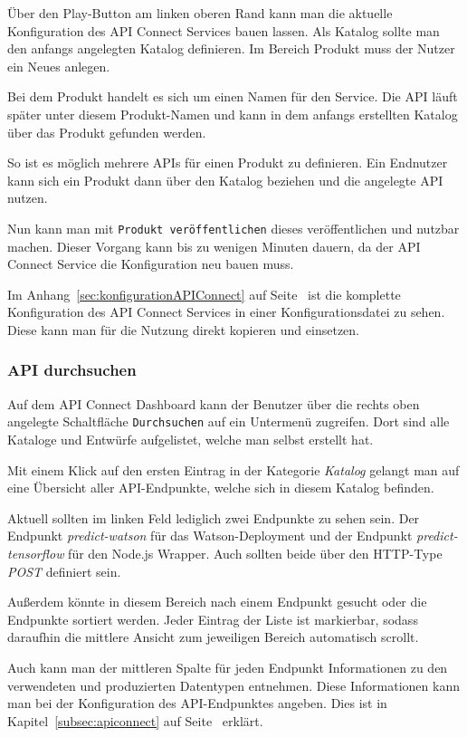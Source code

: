 Über den Play-Button am linken oberen Rand kann man die aktuelle Konfiguration des API Connect Services bauen lassen.
Als Katalog sollte man den anfangs angelegten Katalog definieren. Im Bereich Produkt muss der Nutzer ein Neues anlegen.

Bei dem Produkt handelt es sich um einen Namen für den Service. Die API läuft später unter diesem Produkt-Namen und
kann in dem anfangs erstellten Katalog über das Produkt gefunden werden.

So ist es möglich mehrere APIs für einen Produkt zu definieren. Ein Endnutzer kann sich ein Produkt dann über den
Katalog beziehen und die angelegte API nutzen.

Nun kann man mit \texttt{Produkt veröffentlichen} dieses veröffentlichen und nutzbar machen. Dieser Vorgang kann bis zu
wenigen Minuten dauern, da der API Connect Service die Konfiguration neu bauen muss.

Im Anhang~\ref{sec:konfigurationAPIConnect} auf Seite~\pageref{sec:konfigurationAPIConnect} ist die komplette
Konfiguration des API Connect Services in einer Konfigurationsdatei zu sehen. Diese kann man für die Nutzung direkt
kopieren und einsetzen.

\subsubsection{API durchsuchen}
Auf dem API Connect Dashboard kann der Benutzer über die rechts oben angelegte Schaltfläche \texttt{Durchsuchen} auf ein
Untermenü zugreifen. Dort sind alle Kataloge und Entwürfe aufgelistet, welche man selbst erstellt hat.

Mit einem Klick auf den ersten Eintrag in der Kategorie \textit{Katalog} gelangt man auf eine Übersicht aller
API-Endpunkte, welche sich in diesem Katalog befinden.

Aktuell sollten im linken Feld lediglich zwei Endpunkte zu sehen sein. Der Endpunkt \textit{predict-watson} für das
Watson-Deployment und der Endpunkt \textit{predict-tensorflow} für den Node.js Wrapper. Auch sollten beide über
den HTTP-Type \textit{POST} definiert sein.

Außerdem könnte in diesem Bereich nach einem Endpunkt gesucht oder die Endpunkte sortiert werden. Jeder Eintrag der
Liste ist markierbar, sodass daraufhin die mittlere Ansicht zum jeweiligen Bereich automatisch scrollt.

Auch kann man der mittleren Spalte für jeden Endpunkt Informationen zu den verwendeten und produzierten Datentypen
entnehmen. Diese Informationen kann man bei der Konfiguration des API-Endpunktes angeben. Dies ist in
Kapitel~\ref{subsec:apiconnect} auf Seite~\pageref{subsec:apiconnect} erklärt.

